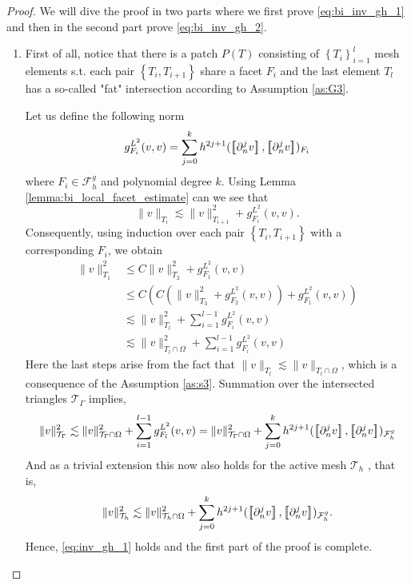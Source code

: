\begin{proof}
    We will dive the proof in two parts where we first prove \eqref{eq:bi_inv_gh_1} and then in the second part prove \eqref{eq:bi_inv_gh_2}.
    \begin{enumerate}[label=\arabic*)]
        \item
            First of all, notice that there is a patch $P(T) $ consisting of $\left\{ T_{i} \right\}_{i=1}^{l} $ mesh elements s.t. each pair $ \left\{ T_{i}, T_{i+1} \right\} $ share a facet $F_{i}$ and the last element $T_{l}$ has a so-called "fat"
            intersection according to Assumption \ref{as:G3}.

            Let us define the following norm \[
            g_{F_{i}}^{L^{2}}( v,v)  = \sum_{j=0}^{k} h^{2j+1}( \jump{ \partial ^{j}_{n}v }, \jump{ \partial ^{j}_{n}v }    )_{F_{i} }
            \]
            where $F_{i} \in  \mathcal{F} ^{g}_{h}$ and polynomial degree $ k$. Using Lemma \ref{lemma:bi_local_facet_estimate} can we see that \[
            \| v \|_{ T_{i} }^{  } \lesssim \| v \|_{ T_{i+1} }^{ 2 } + g_{F_{i}}^{L^{2}}( v,v).
            \]
    Consequently, using induction over each pair $\left\{ T_{i}, T_{i+1} \right\} $ with a corresponding $F_{i}$, we obtain
            \[
                \begin{split}
            \| v \|_{ T_{1} }^{2  }  & \le  C \| v \|_{ T_{2} }^{ 2 } + g_{F_{1}}^{L^{2}}( v,v)\\
              & \le  C( C( \| v \|_{ T_{3} }^{ 2 } + g_{F_{2}}^{L^{2}}( v,v) ) + g_{F_{1}}^{L^{2}}( v,v) )\\
              & \lesssim    \| v \|_{ T_{l} }^{ 2 }  + \sum_{i=1}^{l-1} g_{F_{i}}^{L^{2}}( v,v)  \\
              & \lesssim    \| v \|_{ T_{l} \cap \Omega  }^{ 2 }  + \sum_{i=1}^{l-1} g_{F_{i}}^{L^{2}}( v,v)
                \end{split}
            \]
            Here the last steps arise from the fact that $\|  v \|_{ T_{l} }^{  } \lesssim  \|  v \|_{ T_{l} \cap \Omega  }^{  }  $, which is a consequence of the Assumption \ref{as:s3}.
Summation over the intersected triangles $\mathcal{T} _{\Gamma }$ implies,
            \[
                    \| v \|_{ \mathcal{T} _{\Gamma } }^{2  } \lesssim \| v \|_{ \mathcal{T} _{\Gamma}\cap \Omega  }^{2  }+ \sum_{i=1}^{l-1} g_{F_{l}}^{L^{2}}( v,v) \\
                     = \| v \|_{ \mathcal{T}_{\Gamma } \cap \Omega   }^{ 2 }  + \sum_{j=0}^{k} h^{2j+1} ( \jump{ \partial ^{j}_{n} v }, \jump{ \partial ^{j}_{n}v }    )_{\mathcal{F}_{h}^{g}}
        \]
        And as a trivial extension this now also holds for the active mesh $\mathcal{T} _{h}$ , that is, \[
                    \| v \|_{ \mathcal{T} _{h } }^{2  } \lesssim  \| v \|_{ \mathcal{T}_{h } \cap \Omega   }^{ 2 }  + \sum_{j=0}^{k} h^{2j+1} ( \jump{ \partial ^{j}_{n} v }, \jump{ \partial ^{j}_{n}v }    )_{\mathcal{F}_{h}^{g}}.
        \]
        Hence, \eqref{eq:inv_gh_1} holds and the first part of the proof is complete.


\end{enumerate}
\end{proof}
